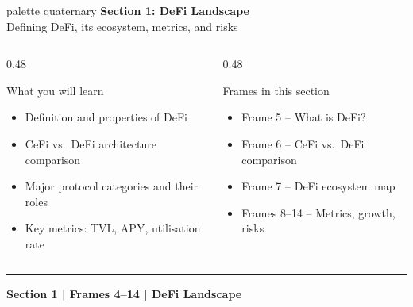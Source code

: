 \documentclass[8pt,aspectratio=169]{beamer}
\newcommand{\bottomnote}[1]{\vfill\vspace{-2mm}\textcolor{mllavender2}{\rule{\textwidth}{0.4pt}}\vspace{1mm}\footnotesize\textbf{#1}}
\begin{document}
\begin{frame}
  \begin{beamercolorbox}[sep=12pt,center,rounded=true,shadow=true]{palette quaternary}
    {\Large\bfseries Section 1: DeFi Landscape}\\{}\vspace{6pt}
    {\normalsize Defining DeFi, its ecosystem, metrics, and risks}
  \end{beamercolorbox}
  \vspace{8mm}
  \begin{columns}[T]
    \begin{column}{0.48\textwidth}
      \begin{block}{What you will learn}
        \begin{itemize}\setlength\itemsep{2pt}
          \item Definition and properties of DeFi
          \item CeFi vs.\ DeFi architecture comparison
          \item Major protocol categories and their roles
          \item Key metrics: TVL, APY, utilisation rate
        \end{itemize}
      \end{block}
    \end{column}
    \begin{column}{0.48\textwidth}
      \begin{block}{Frames in this section}
        \begin{itemize}\setlength\itemsep{2pt}
          \item Frame 5 -- What is DeFi?
          \item Frame 6 -- CeFi vs.\ DeFi comparison
          \item Frame 7 -- DeFi ecosystem map
          \item Frames 8--14 -- Metrics, growth, risks
        \end{itemize}
      \end{block}
    \end{column}
  \end{columns}
  \bottomnote{Section 1 | Frames 4--14 | DeFi Landscape}
\end{frame}
\end{document}
